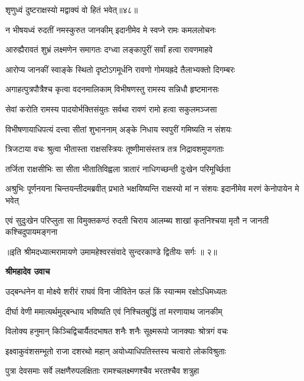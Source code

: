 {शृणुध्वं दुष्टराक्षस्यो मद्वाक्यं वो हितं भवेत्॥४८॥} %


\twolineshloka
{न भीषयध्वं रुदतीं नमस्कुरुत जानकीम्}
{इदानीमेव मे स्वप्ने रामः कमललोचनः} %

\twolineshloka
{आरुह्यैरावतं शुभ्रं लक्ष्मणेन समागतः}
{दग्ध्वा लङ्कापुरीं सर्वां हत्वा रावणमाहवे} %

\twolineshloka
{आरोप्य जानकीं स्वाङ्के स्थितो दृष्टोऽगमूर्धनि}
{रावणो गोमयह्रदे तैलाभ्यक्तो दिगम्बरः} %

\twolineshloka
{अगाहत्पुत्रपौत्रैश्च कृत्वा वदनमालिकाम्}
{विभीषणस्तु रामस्य सन्निधौ हृष्टमानसः} %

\twolineshloka
{सेवां करोति रामस्य पादयोर्भक्तिसंयुतः}
{सर्वथा रावणं रामो हत्वा सकुलमञ्जसा} %

\twolineshloka
{विभीषणायाधिपत्यं दत्त्वा सीतां शुभाननाम्}
{अङ्के निधाय स्वपुरीं गमिष्यति न संशयः} %

\twolineshloka
{त्रिजटाया वचः श्रुत्वा भीतास्ता राक्षसस्त्रियः}
{तूष्णीमासंस्तत्र तत्र निद्रावशमुपागताः} %

\twolineshloka
{तर्जिता राक्षसीभिः सा सीता भीतातिविह्वला}
{त्रातारं नाधिगच्छन्ती दुःखेन परिमूर्च्छिता} %

\threelineshloka
{अश्रुभिः पूर्णनयना चिन्तयन्तीदमब्रवीत्}
{प्रभाते भक्षयिष्यन्ति राक्षस्यो मां न संशयः}
{इदानीमेव मरणं केनोपायेन मे भवेत्} %

\fourlineindentedshloka
{एवं सुदुःखेन परिप्लुता सा}
{विमुक्तकण्ठं रुदती चिराय}
{आलम्ब्य शाखां कृतनिश्चया मृतौ}
{न जानती कश्चिदुपायमङ्गना} %

{॥इति श्रीमदध्यात्मरामायणे उमामहेश्वरसंवादे सुन्दरकाण्डे
द्वितीयः सर्गः ॥ २॥
}




\textbf{श्रीमहादेव उवाच}

\twolineshloka
{उद्बन्धनेन वा मोक्ष्ये शरीरं राघवं विना}
{जीवितेन फलं किं स्यान्मम रक्षोऽधिमध्यतः} %

\twolineshloka
{दीर्घा वेणी ममात्यर्थमुद्बन्धाय भविष्यति}
{एवं निश्चितबुद्धिं तां मरणायाथ जानकीम्} %

\twolineshloka
{विलोक्य हनुमान् किञ्चिद्विचार्यैतदभाषत}
{शनैः शनैः सूक्ष्मरूपो जानक्याः श्रोत्रगं वचः} %

\twolineshloka
{इक्ष्वाकुवंशसम्भूतो राजा दशरथो महान्}
{अयोध्याधिपतिस्तस्य चत्वारो लोकविश्रुताः} %

\twolineshloka
{पुत्रा देवसमाः सर्वे लक्षणैरुपलक्षिताः}
{रामश्चलक्ष्मणश्चैव भरतश्चैव शत्रुहा} %

